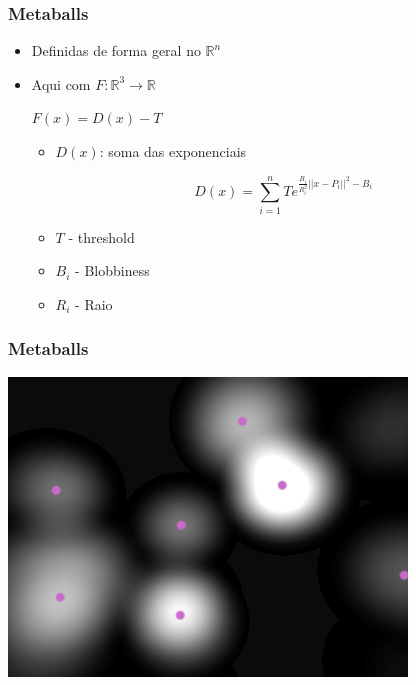 \documentclass[brazil]{beamer}
\begin{document}
    \begin{frame}
      \frametitle{Metaballs}
      \begin{itemize}
        \item Definidas de forma geral no $\mathbb{R}^n$
        \item Aqui com $F:\mathbb{R}^3 \to \mathbb{R}$
        \vspace{.5em}
        \begin{center}
          $F(x) = D(x) - T$
        \end{center}
        \begin{itemize}
          \item $D(x)$: soma das exponenciais
            \vspace{-1.0em}
            \begin{center}
              $$D(x) = \sum_{i = 1}^n Te^{\frac{B_i}{R_i^2}||x-P_i||^2-B_i} $$
            \end{center}
          \item $T$ - threshold
          \item $B_i$ - Blobbiness
          \item $R_i$ - Raio
        \end{itemize}
      \end{itemize}
    \end{frame}
      
    \begin{frame}
      \frametitle{Metaballs}
        \begin{center}
          \includegraphics[width=.7\textwidth]{imgs/metaball-2d-1.png}
        \end{center}
    \end{frame}
\end{document}
